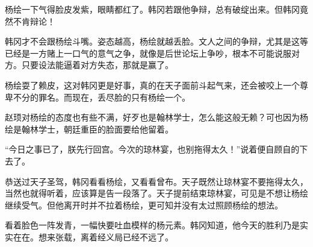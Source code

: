 杨绘一下气得脸皮发紫，眼睛都红了。韩冈若跟他争辩，总有破绽出来。但韩冈竟然不肯辩论！

韩冈才不会跟杨绘斗嘴。姿态越高，杨绘就越丢脸。文人之间的争辩，尤其是这等已经是一方赌上一口气的意气之争，就像是后世论坛上争吵，根本不可能说服对方。只要设法能逼着对方失态，那就是赢了。

杨绘耍了赖皮，这对韩冈更是好事，真的在天子面前斗起气来，还会被咬上一个尊卑不分的罪名。而现在，丢尽脸的只有杨绘一个。

赵顼对杨绘的态度也有些不满，好歹也是翰林学士，怎么能这般无赖？可也因为杨绘是翰林学士，朝廷重臣的脸面要给他留着。

“今日之事已了，朕先行回宫。今次的琼林宴，也别拖得太久！”说着便自顾自的下去了。

恭送过天子圣驾，韩冈看看杨绘，又看看曾布。天子既然让琼林宴不要拖得太久，当然也就得听着，应该算是告一段落了。天子提前结束琼林宴，可见是不想让杨绘继续受气。但他离开时并不拉着杨绘，更可知并没有太过照顾杨绘的想法。

看着脸色一阵发青，一幅快要吐血模样的杨元素。韩冈知道，他今天的胜利乃是实实在在。想来张载，离着经义局已经不远了。

